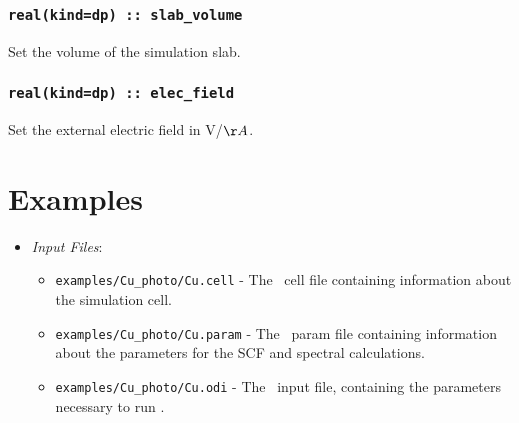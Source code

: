 \documentclass[a4paper,11pt,twoside]{book}
\begin{document}
\subsection[slab\_volume]{\tt real(kind=dp) :: slab\_volume}

Set the volume of the simulation slab.

\subsection[elec\_field]{\tt real(kind=dp) :: elec\_field}

Set the external electric field in V/$\AA$.

\chapter{Examples}

\begin{itemize}
This is an example of using photoemission module for calculating the photoemission properties of Cu(111) surface using a 16 atomic layers slab. 
\item \emph{Input Files}:
\begin{itemize}
\item \verb#examples/Cu_photo/Cu.cell# - The \castep\ cell file containing information about the simulation cell.
\item \verb#examples/Cu_photo/Cu.param# - The \castep\ param file containing information about the parameters for the SCF and spectral calculations.
\item \verb#examples/Cu_photo/Cu.odi# - The \optados\ input file, containing the parameters necessary to run \optados.
\end{itemize}
\end{itemize}
\end{document}

